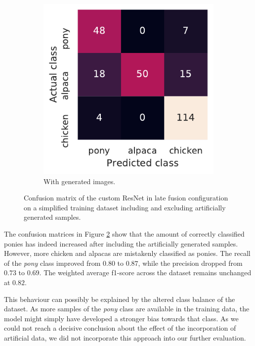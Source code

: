 \documentclass{l4proj}
\begin{document}
\begin{figure}[ht]
\begin{subfigure}[h!]{0.3\textwidth}
    \includegraphics[width=\textwidth]{images/evaluation/autoencoder/confusion_autoencoder}
    \caption{With generated images.}
    \label{fig:auto_confusion_auto}
  \end{subfigure}
  \caption{Confusion matrix of the custom ResNet in late fusion configuration on a simplified training dataset including and excluding artificially generated samples.}
  \label{fig:auto_confusion}
\end{figure}

The confusion matrices in Figure \ref{fig:auto_confusion} show that the amount of correctly classified ponies has indeed increased after including the artificially generated samples. However, more chicken and alpacas are mistakenly classified as ponies. The recall of the \textit{pony} class improved from $0.80$ to $0.87$, while the precision dropped from $0.73$ to $0.69$. The weighted average f1-score across the dataset remains unchanged at $0.82$. 

This behaviour can possibly be explained by the altered class balance of the dataset. As more samples of the \textit{pony} class are available in the training data, the model might simply have developed a stronger bias towards that class. As we could not reach a decisive conclusion about the effect of the incorporation of artificial data, we did not incorporate this approach into our further evaluation.
\end{document}
